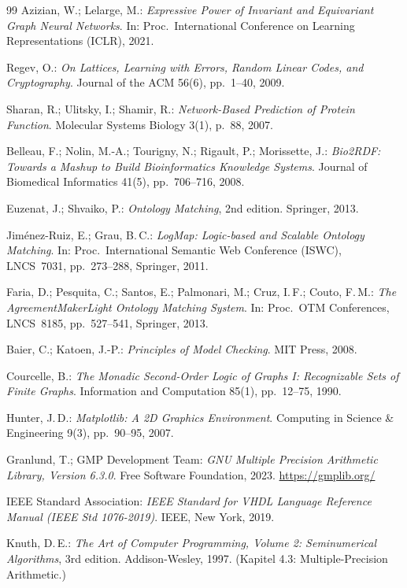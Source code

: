 ﻿\documentclass[a4paper,12pt]{article}
\theoremstyle{definition}
\begin{document}
\begin{thebibliography}{99}
Azizian, W.; Lelarge, M.:
\textit{Expressive Power of Invariant and Equivariant Graph Neural Networks}.
In: Proc.\ International Conference on Learning Representations (ICLR), 2021.

Regev, O.:
\textit{On Lattices, Learning with Errors, Random Linear Codes, and Cryptography}.
Journal of the ACM 56(6), pp.\ 1--40, 2009.

Sharan, R.; Ulitsky, I.; Shamir, R.:
\textit{Network-Based Prediction of Protein Function}.
Molecular Systems Biology 3(1), p.\ 88, 2007.

Belleau, F.; Nolin, M.-A.; Tourigny, N.; Rigault, P.; Morissette, J.:
\textit{Bio2RDF: Towards a Mashup to Build Bioinformatics Knowledge Systems}.
Journal of Biomedical Informatics 41(5), pp.\ 706--716, 2008.

Euzenat, J.; Shvaiko, P.:
\textit{Ontology Matching}, 2nd edition. Springer, 2013.

Jiménez-Ruiz, E.; Grau, B.\,C.:
\textit{LogMap: Logic-based and Scalable Ontology Matching}.
In: Proc.\ International Semantic Web Conference (ISWC), LNCS~7031,
pp.\ 273--288, Springer, 2011.

Faria, D.; Pesquita, C.; Santos, E.; Palmonari, M.; Cruz, I.\,F.; Couto, F.\,M.:
\textit{The AgreementMakerLight Ontology Matching System}.
In: Proc.\ OTM Conferences, LNCS~8185, pp.\ 527--541, Springer, 2013.

Baier, C.; Katoen, J.-P.:
\textit{Principles of Model Checking}.
MIT Press, 2008.

Courcelle, B.:
\textit{The Monadic Second-Order Logic of Graphs I: Recognizable Sets of Finite Graphs}.
Information and Computation 85(1), pp.\ 12--75, 1990.

Hunter, J.\,D.:
\textit{Matplotlib: A 2D Graphics Environment}.
Computing in Science \& Engineering 9(3), pp.\ 90--95, 2007.

Granlund, T.; GMP Development Team:
\textit{GNU Multiple Precision Arithmetic Library, Version 6.3.0}.
Free Software Foundation, 2023.
\url{https://gmplib.org/}

IEEE Standard Association:
\textit{IEEE Standard for VHDL Language Reference Manual (IEEE Std 1076-2019)}.
IEEE, New York, 2019.

Knuth, D.\,E.:
\textit{The Art of Computer Programming, Volume 2: Seminumerical Algorithms},
3rd edition. Addison-Wesley, 1997. (Kapitel 4.3: Multiple-Precision Arithmetic.)

\end{thebibliography}
\end{document}
